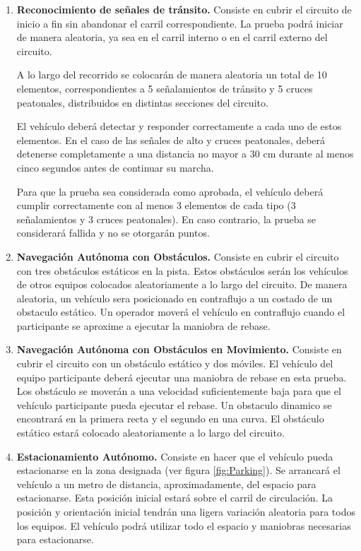 \documentclass[letterpaper,12pt]{article}
\begin{document}
\begin{enumerate}
\item \textbf{Reconocimiento de señales de tránsito.} Consiste en cubrir el circuito de inicio a fin sin abandonar el carril correspondiente. La prueba podrá iniciar de manera aleatoria, ya sea en el carril interno o en el carril externo del circuito.

A lo largo del recorrido se colocarán de manera aleatoria un total de 10 elementos, correspondientes a 5 señalamientos de tránsito y 5 cruces peatonales, distribuidos en distintas secciones del circuito.

El vehículo deberá detectar y responder correctamente a cada uno de estos elementos. En el caso de las señales de alto y cruces peatonales, deberá detenerse completamente a una distancia no mayor a 30 cm durante al menos cinco segundos antes de continuar su marcha.

Para que la prueba sea considerada como aprobada, el vehículo deberá cumplir correctamente con al menos 3 elementos de cada tipo (3 señalamientos y 3 cruces peatonales). En caso contrario, la prueba se considerará fallida y no se otorgarán puntos.
\item \textbf{Navegación Autónoma con Obstáculos.} Consiste en cubrir el circuito con tres obstáculos estáticos en la pista. Estos obstáculos serán los vehículos de otros equipos colocados aleatoriamente a lo largo del circuito. De manera aleatoria, un vehículo sera posicionado en contraflujo a un costado de un obstaculo estático. Un operador moverá el vehículo en contraflujo cuando el participante se aproxime a ejecutar la maniobra de rebase.
\item \textbf{Navegación Autónoma con Obstáculos en Movimiento.} Consiste en cubrir el circuito con un obstáculo estático y dos móviles. El vehículo del equipo participante deberá ejecutar una maniobra de rebase en esta prueba. Los obstáculo se moverán a una velocidad suficientemente baja para que el vehículo participante pueda ejecutar el rebase. Un obstaculo dinamico se encontrará en la primera recta y el segundo en una curva. El obstáculo  estático estará colocado aleatoriamente a lo largo del circuito.
\item \textbf{Estacionamiento Autónomo.} Consiste en hacer que el vehículo pueda estacionarse en la zona designada (ver figura \ref{fig:Parking}). Se arrancará el vehículo a un metro de distancia, aproximadamente, del espacio para estacionarse. Esta posición inicial estará sobre el carril de circulación. La posición y orientación inicial tendrán una ligera variación aleatoria para todos los equipos. El vehículo podrá utilizar todo el espacio y maniobras necesarias para estacionarse. 
\end{enumerate}
\end{document}
